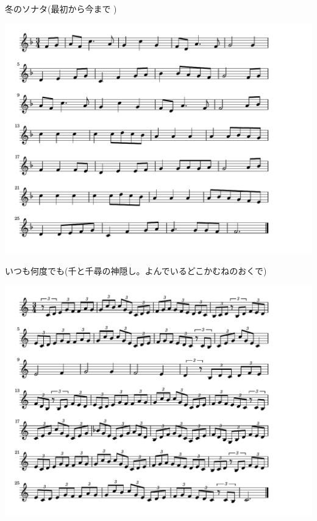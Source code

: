 \documentclass[a4paper]{ltjsarticle}
\begin{document}
\vspace{-10mm} \hspace{10mm}
冬のソナタ(最初から今まで )

\includegraphics[clip]{itsumonando_crop.pdf}

\vspace{-10mm} \hspace{10mm}
いつも何度でも(千と千尋の神隠し。よんでいるどこかむねのおくで)

\includegraphics[clip]{shuyohitononozomino_crop.pdf}
\end{document}
